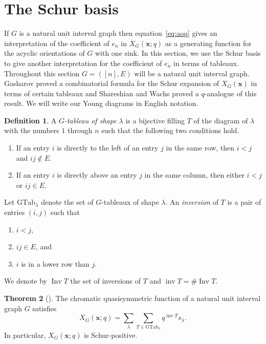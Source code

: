 \documentclass[12pt]{amsart}  %
\theoremstyle{definition}
\newtheorem{theorem}{Theorem}[section]
\newtheorem{definition}[theorem]{Definition}
\theoremstyle{remark}
\numberwithin{equation}{section}
\DeclareMathOperator{\Inv}{Inv}
\DeclareMathOperator{\inv}{inv}
\begin{document}
\section{The Schur basis}\label{sec:Schur}

If $G$ is a natural unit interval graph then equation~\eqref{eq:aoq} gives an interpretation of the coefficient of $e_n$ in $X_G(\bm x;q)$ as a generating function for the acyclic orientations of $G$ with one sink.
In this section, we use the Schur basis to give another interpretation for the coefficient of $e_n$ in terms of tableaux. 
Throughout this section $G=([n],E)$ will be a natural unit interval graph. Gasharov \cite[Theorem 4]{chrompos31} proved a combinatorial formula for the Schur expansion of $X_G(\bm x)$ in terms of certain tableaux and Shareshian and Wachs \cite[Theorem 6.3]{chromposquasi} proved a $q$-analogue of this result. We will write our Young diagrams in English notation.

\begin{definition}
A \emph{$G$-tableau of shape $\lambda$} is a bijective filling $T$ of the diagram of $\lambda$ with the numbers $1$ through $n$ such that the following two conditions hold.
\begin{enumerate}
\item[(C1)] If an entry $i$ is directly to the left of an entry $j$ in the same row, then $i<j$ and $ij\notin E$.
\item[(C2)] If an entry $i$ is directly above an entry $j$ in the same column, then either $i<j$ or $ij\in E$.
\end{enumerate}
Let $\text{GTab}_\lambda$ denote the set of $G$-tableaux of shape $\lambda$. An \emph{inversion} of $T$ is a pair of entries $(i,j)$ such that
\begin{enumerate}
    \item[(I1)] $i<j$,
    \item[(I2)] $ij\in E$, and
    \item[(I3)] $i$ is in a lower row than $j$.    
\end{enumerate}
We denote by $\Inv T$ the set of inversions of $T$ and $\inv T=\#\Inv T$.
\end{definition}

\begin{theorem}[\cite{chromposquasi}]
\label{thm:Gtab}
The chromatic quasisymmetric function of a natural unit interval graph $G$ satisfies
\begin{equation}
\label{eq:s}
X_G(\bm x;q)=\sum_\lambda\sum_{T\in\text{GTab}_\lambda}q^{\inv T}s_\lambda.
\end{equation}
In particular, $X_G(\bm x;q)$ is Schur-positive.
\end{theorem}
\end{document}
